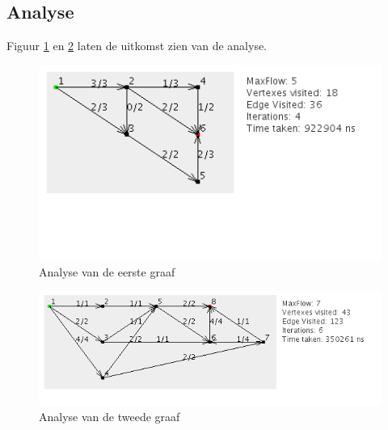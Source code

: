 \subsection{Analyse}

Figuur \ref{fig:DIJKSTRA_graph1} en \ref{fig:DIJKSTRA_graph2} laten de uitkomst zien van de analyse.

\begin{figure}[h]
	\includegraphics[width=\linewidth]{priorityfirst/DIJKSTRA_graph1}
	\centering
	\caption{Analyse van de eerste graaf}
	\label{fig:DIJKSTRA_graph1}
\end{figure}

\begin{figure}[h]
	\includegraphics[width=\linewidth]{priorityfirst/DIJKSTRA_graph2}
	\centering
	\caption{Analyse van de tweede graaf}
	\label{fig:DIJKSTRA_graph2}
\end{figure}